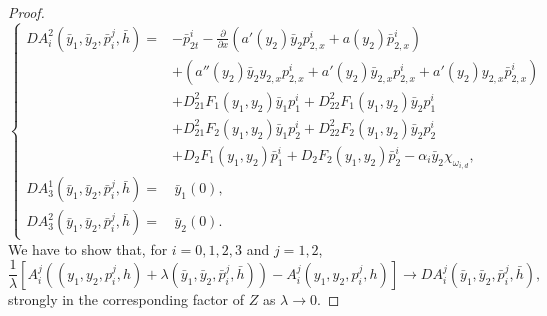 \documentclass[10pt,a4paper]{amsart}
\begin{document}
\begin{proof}
\begin{equation*}
\begin{cases}
		      D A^2_i(\bar y_1,\bar y_2,\bar p_i^j,\bar h) =& - \bar p_{2t}^i - \frac{\partial}{\partial x}\left(a'(y_{2})\bar y_{2} p^i_{2,x} + a(y_{2}) \bar p^i_{2,x}\right) \\
            &+ \left( a''(y_{2})\bar y_{2} y_{2,x} p^i_{2,x} +  a'(y_{2})\bar y_{2,x}  p^i_{2,x} + a'(y_2)y_{2,x} \bar p^i_{2,x} \right)\\
            &+ D_{21}^2 F_1(y_1,y_2)\bar y_1 p^i_1 + D_{22}^2 F_1(y_1,y_2)\bar y_2 p^i_1 \\
            &+ D_{21}^2 F_2(y_1,y_2)\bar y_1 p^i_2 + D_{22}^2 F_2(y_1,y_2)\bar y_2 p^i_2 \\
            &+ D_2 F_1(y_1,y_2) \bar p^i_1 + D_2 F_2(y_1,y_2) \bar p^i_2 
            - \alpha_i \bar y_2 \chi_{\omega_{i,d}}, \\
		      D A^1_3(\bar y_1,\bar y_2,\bar p_i^j,\bar h) =& \, \bar y_1(0),\\
		      D A^2_3(\bar y_1,\bar y_2,\bar p_i^j,\bar h) =& \, \bar y_2(0).
        \end{cases}
    \end{equation*}We have to show that, for $i=0,1,2,3$ and $j=1,2$, 
    $$
        \frac{1}{\lambda}\left[ A^j_i (( y_1, y_2, p_i^j, h)+\lambda(\bar y_1,\bar y_2,\bar p_i^j,\bar h)) - A^j_i ( y_1, y_2, p_i^j, h) \right] \to D A^j_i(\bar y_1,\bar y_2,\bar p_i^j,\bar h),
    $$
    strongly in the corresponding factor of $Z$ as $\lambda \to 0$.


\end{proof}
\end{document}
